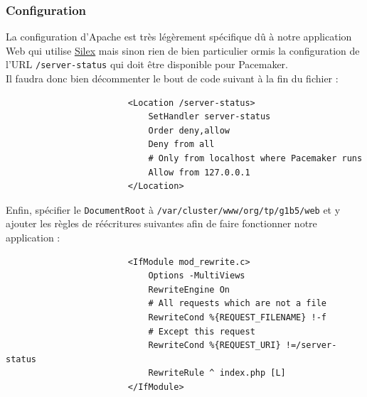 \documentclass[11pt,a4paper]{report}
\begin{document}
                \subsubsection{Configuration}
                    
                    La configuration d'Apache est tr\`es l\'eg\`erement sp\'ecifique d\^u \`a notre application Web qui utilise \underline{\href{http://silex.sensiolabs.org}{Silex}} mais sinon rien de bien particulier ormis la configuration de l'URL \verb+/server-status+ qui doit \^etre disponible pour Pacemaker.\\
                    
                    Il faudra donc bien d\'ecommenter le bout de code suivant \`a la fin du fichier :\\
                    
                    \begin{verbatim}
                        <Location /server-status>
                            SetHandler server-status
                            Order deny,allow
                            Deny from all
                            # Only from localhost where Pacemaker runs
                            Allow from 127.0.0.1
                        </Location>
                    \end{verbatim}
                    
                    Enfin, sp\'ecifier le \verb+DocumentRoot+ \`a \verb+/var/cluster/www/org/tp/g1b5/web+ et y ajouter les r\`egles de r\'e\'ecritures suivantes afin de faire fonctionner notre application :\\
                    
                    \begin{verbatim}
                        <IfModule mod_rewrite.c>
                            Options -MultiViews
                            RewriteEngine On
                            # All requests which are not a file
                            RewriteCond %{REQUEST_FILENAME} !-f
                            # Except this request
                            RewriteCond %{REQUEST_URI} !=/server-status
                            RewriteRule ^ index.php [L]
                        </IfModule>
                    \end{verbatim}
                    
\end{document}
